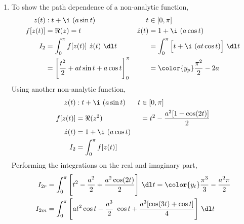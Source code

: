\begin{enumerate}
\begin{enumerate}
              \item To show the path dependence of a non-analytic function,
                    \begin{align}
                        z(t)                   & : t + \i\ (a\sin t)                &
                        t                      & \in [0, \pi]                         \\
                        f[z(t)]                & = \Re{(z)} = t                     &
                        \dot{z}(t)             & = 1 + \i\ (a\cos t)                  \\
                        I_2                    & = \int_{0}^{\pi} f[z(t)]
                        \ \dot{z}(t)\ \dl t    &
                                               & = \int_{0}^{\pi} \Big[t
                        + \i\ (at \cos t)\Big]\ \dl t                                 \\
                                               & = \Bigg[ \frac{t^2}{2} + at\sin t
                        + a\cos t \Bigg]_0^\pi &
                                               & = \color{y_p} \frac{\pi^2}{2} - 2a
                    \end{align}
                    Using another non-analytic function,
                    \begin{align}
                        z(t)       & : t + \i\ (a\sin t)                 &
                        t          & \in [0, \pi]                          \\
                        f[z(t)]    & = \Re{(z^2)}                        &
                                   & = t^2 - \frac{a^2[1 - \cos(2t)]}{2}   \\
                        \dot{z}(t) & = 1 + \i\ (a\cos t)                   \\
                        I_2        & = \int_{0}^{\pi} f[z(t)]
                    \end{align}
                    Performing the integrations on the real and imaginary part,
                    \begin{align}
                        I_{2r} & = \int_{0}^{\pi} \Bigg[t^2 -\frac{a^2}{2}
                            + \frac{a^2\cos(2t)}{2}\Bigg]\ \dl t
                        = \color{y_t} \frac{\pi^3}{3} - \frac{a^2\pi}{2}             \\
                        I_{2m} & = \int_{0}^{\pi} \Bigg[at^2\cos t - \frac{a^3}{2}
                        \ \cos t + \frac{a^3 [\cos(3t) + \cos t]}{4}\Bigg]\ \dl t    \\

\end{align}
\end{enumerate}
\end{enumerate}
